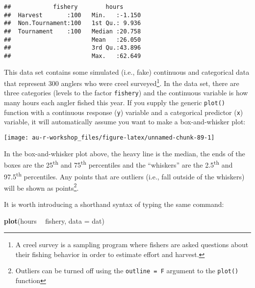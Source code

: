 \documentclass[]{book}
\newenvironment{Shaded}{\begin{snugshade}}{\end{snugshade}}
\newcommand{\KeywordTok}[1]{\textcolor[rgb]{0.13,0.29,0.53}{\textbf{#1}}}
\newcommand{\DataTypeTok}[1]{\textcolor[rgb]{0.13,0.29,0.53}{#1}}
\newcommand{\StringTok}[1]{\textcolor[rgb]{0.31,0.60,0.02}{#1}}
\newcommand{\OperatorTok}[1]{\textcolor[rgb]{0.81,0.36,0.00}{\textbf{#1}}}
\newcommand{\NormalTok}[1]{#1}
\let\rmarkdownfootnote\footnote%
\def\footnote{\protect\rmarkdownfootnote}
\theoremstyle{definition}
\theoremstyle{definition}
\theoremstyle{definition}
\theoremstyle{remark}
\begin{document}
\begin{verbatim}
##            fishery        hours       
##  Harvest       :100   Min.   :-1.150  
##  Non.Tournament:100   1st Qu.: 9.936  
##  Tournament    :100   Median :20.758  
##                       Mean   :26.050  
##                       3rd Qu.:43.896  
##                       Max.   :62.649
\end{verbatim}

This data set contains some simulated (i.e., fake) continuous and
categorical data that represent 300 anglers who were creel
surveyed\footnote{A creel survey is a sampling program where fishers are
  asked questions about their fishing behavior in order to estimate
  effort and harvest.}. In the data set, there are three categories
(levels to the factor \texttt{fishery}) and the continuous variable is
how many hours each angler fished this year. If you supply the generic
\texttt{plot()} function with a continuous response (\texttt{y})
variable and a categorical predictor (\texttt{x}) variable, it will
automatically assume you want to make a box-and-whisker plot:

\begin{Shaded}
\end{Shaded}

\begin{center}\texttt{[image: au-r-workshop\_files/figure-latex/unnamed-chunk-89-1]} \end{center}

In the box-and-whisker plot above, the heavy line is the median, the
ends of the boxes are the 25\textsuperscript{th} and
75\textsuperscript{th} percentiles and the ``whiskers'' are the
2.5\textsuperscript{th} and 97.5\textsuperscript{th} percentiles. Any
points that are outliers (i.e., fall outside of the whiskers) will be
shown as points\footnote{Outliers can be turned off using the
  \texttt{outline\ =\ F} argument to the \texttt{plot()} function}.

It is worth introducing a shorthand syntax of typing the same command:

\begin{Shaded}
\begin{Highlighting}[]
\KeywordTok{plot}\NormalTok{(hours }\OperatorTok{~}\StringTok{ }\NormalTok{fishery, }\DataTypeTok{data =}\NormalTok{ dat)}
\end{Highlighting}
\end{Shaded}
\end{document}
